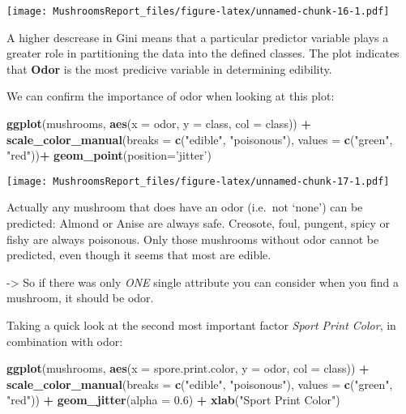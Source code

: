 \documentclass[]{article}
\newenvironment{Shaded}{\begin{snugshade}}{\end{snugshade}}
\newcommand{\KeywordTok}[1]{\textcolor[rgb]{0.13,0.29,0.53}{\textbf{#1}}}
\newcommand{\DataTypeTok}[1]{\textcolor[rgb]{0.13,0.29,0.53}{#1}}
\newcommand{\FloatTok}[1]{\textcolor[rgb]{0.00,0.00,0.81}{#1}}
\newcommand{\StringTok}[1]{\textcolor[rgb]{0.31,0.60,0.02}{#1}}
\newcommand{\OperatorTok}[1]{\textcolor[rgb]{0.81,0.36,0.00}{\textbf{#1}}}
\newcommand{\NormalTok}[1]{#1}
\begin{document}
\texttt{[image: MushroomsReport\_files/figure-latex/unnamed-chunk-16-1.pdf]}

A higher descrease in Gini means that a particular predictor variable
plays a greater role in partitioning the data into the defined classes.
The plot indicates that \textbf{Odor} is the most predicive variable in
determining edibility.

We can confirm the importance of odor when looking at this plot:

\begin{Shaded}
\begin{Highlighting}[]
\KeywordTok{ggplot}\NormalTok{(mushrooms, }\KeywordTok{aes}\NormalTok{(}\DataTypeTok{x =}\NormalTok{ odor, }\DataTypeTok{y =}\NormalTok{ class, }\DataTypeTok{col =}\NormalTok{ class)) }\OperatorTok{+}\StringTok{ }
\StringTok{  }\KeywordTok{scale_color_manual}\NormalTok{(}\DataTypeTok{breaks =} \KeywordTok{c}\NormalTok{(}\StringTok{"edible"}\NormalTok{, }\StringTok{"poisonous"}\NormalTok{), }
                     \DataTypeTok{values =} \KeywordTok{c}\NormalTok{(}\StringTok{"green"}\NormalTok{, }\StringTok{"red"}\NormalTok{))}\OperatorTok{+}\StringTok{ }\KeywordTok{geom_point}\NormalTok{(}\DataTypeTok{position=}\StringTok{'jitter'}\NormalTok{) }
\end{Highlighting}
\end{Shaded}

\texttt{[image: MushroomsReport\_files/figure-latex/unnamed-chunk-17-1.pdf]}

Actually any mushroom that does have an odor (i.e.~not `none') can be
predicted: Almond or Anise are always safe. Creosote, foul, pungent,
spicy or fishy are always poisonous. Only those mushrooms without odor
cannot be predicted, even though it seems that most are edible.

-\textgreater{} So if there was only \emph{ONE} single attribute you can
consider when you find a mushroom, it should be odor.

Taking a quick look at the second most important factor \emph{Sport
Print Color}, in combination with odor:

\begin{Shaded}
\begin{Highlighting}[]
\KeywordTok{ggplot}\NormalTok{(mushrooms, }\KeywordTok{aes}\NormalTok{(}\DataTypeTok{x =}\NormalTok{ spore.print.color, }\DataTypeTok{y =}\NormalTok{ odor, }\DataTypeTok{col =}\NormalTok{ class)) }\OperatorTok{+}\StringTok{ }
\StringTok{  }\KeywordTok{scale_color_manual}\NormalTok{(}\DataTypeTok{breaks =} \KeywordTok{c}\NormalTok{(}\StringTok{"edible"}\NormalTok{, }\StringTok{"poisonous"}\NormalTok{), }
                     \DataTypeTok{values =} \KeywordTok{c}\NormalTok{(}\StringTok{"green"}\NormalTok{, }\StringTok{"red"}\NormalTok{)) }\OperatorTok{+}
\StringTok{  }\KeywordTok{geom_jitter}\NormalTok{(}\DataTypeTok{alpha =} \FloatTok{0.6}\NormalTok{) }\OperatorTok{+}
\StringTok{  }\KeywordTok{xlab}\NormalTok{(}\StringTok{"Sport Print Color"}\NormalTok{)}
\end{Highlighting}
\end{Shaded}
\end{document}
